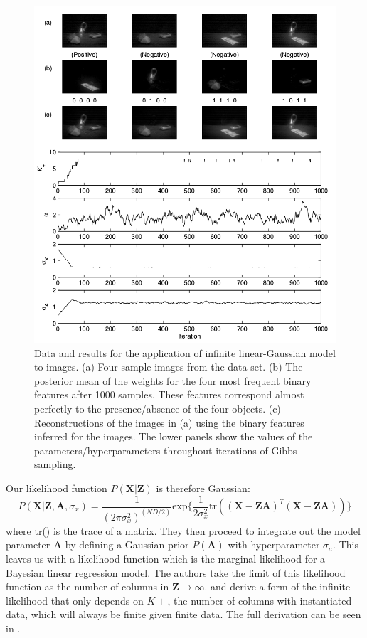 \documentclass[twoside]{article}
\begin{document}
\begin{figure}[h]
  \centering
    \includegraphics[scale=0.40]{exp}
    \caption{Data and results for the application of infinite linear-Gaussian model to images. (a) Four sample images from the data set. (b) The posterior mean of the weights for the four most frequent binary features after 1000 samples. These features correspond almost perfectly to the presence/absence of the four objects. (c) Reconstructions of the images in (a) using the binary features inferred for the images. The lower panels show the values of the parameters/hyperparameters throughout iterations of Gibbs sampling.}
  \label{fig:exp}
\end{figure}

Our likelihood function $P(\mathbf{X|Z})$ is therefore Gaussian:
\begin{equation}
    P(\mathbf{X|Z, A}, \sigma_x) = \frac{1}{(2\pi\sigma_x^2)^{(ND/2)}}\text{exp}\{\frac{1}{2\sigma_x^2} \text{tr}((\mathbf{X-ZA})^T(\mathbf{X-ZA}))\}
\end{equation}
where tr() is the trace of a matrix. They then proceed to integrate out the model parameter $\mathbf{A}$ by defining a Gaussian prior $P(\mathbf{A})$ with hyperparameter $\sigma_a$. This leaves us with a likelihood function which is the marginal likelihood for a Bayesian linear regression model. The authors take the limit of this likelihood function as the number of columns in $\mathbf{Z} \to \infty$. and derive a form of the infinite likelihood that only depends on $K+$, the number of columns with instantiated data, which will always be finite given finite data. The full derivation can be seen in \citet{Griffiths2011}.
\end{document}
